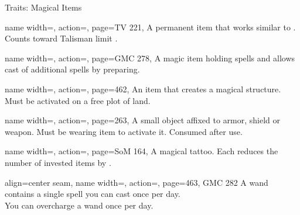 \begin{PageBack}
\begin{Tables}{\backTableHeight}
\begin{Table}{Traits: Magical Items}
\begin{entry}{}{%
                name width=\conditionLength,%
                action=\Spellheart,
                page=TV 221,
            }
                A permanent item that works similar to . Counts toward Talisman limit
                . \hfill{}
            \end{entry}
            \begin{entry}{}{%
                name width=\conditionLength,%
                action=\Staff,
                page=GMC 278,
            }
                A magic item holding spells and allows cast of additional spells by preparing.
            \end{entry}
            \begin{entry}{}{%
                name width=\conditionLength,%
                action=\Structure,
                page=462,
            }
                An item that creates a magical structure. Must be activated on a free plot of land. 
            \end{entry}
            \begin{entry}{}{%
                name width=\conditionLength,%
                action=\Talisman,
                page=263,
            }
                A small object affixed to armor, shield or weapon. Must be wearing item to activate it.
                Consumed after use. 
            \end{entry}
            \begin{entry}{}{%
                name width=\conditionLength,%
                action=\Tattoo,
                page=SoM 164,
            }
                A magical tattoo. Each reduces the number of invested items by .
            \end{entry}
            \begin{entry}{}{%
                align=center seam,
                name width=\conditionLength,%
                action=\Wand,
                page={463, GMC 282}
            }
                A wand contains a single spell you can cast once per day. \\You can overcharge a wand once per
                day. \Flat[][val=5]  \hfill {}
            \end{entry}
        \end{Table}
    \end{Tables}%
\end{PageBack}